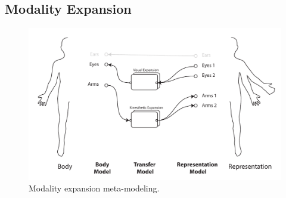 



\subsection{Modality Expansion}
\label{sec:concept-ModAlt}


\begin{figure}[htpb]
  \centering
  \captionsetup{justification=centering}
\includegraphics[width=1\textwidth]{figures/concept/EDD-Expansion.pdf}
\caption{Modality expansion meta-modeling.}
  \label{fig:concept-EDD-ModExp}
\end{figure}


